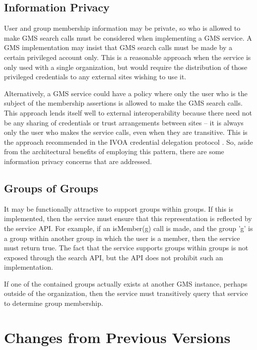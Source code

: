 \documentclass[11pt,a4paper]{ivoa}
\begin{document}
\subsection{Information Privacy}
\label{subsec:infopriv}

User and group membership information may be private, so who is allowed to make GMS search calls must be considered when implementing a GMS service.  A GMS implementation may insist that GMS search calls must be made by a certain privileged account only.  This is a reasonable approach when the service is only used with a single organization, but would require the distribution of those privileged credentials to any external sites wishing to use it.

Alternatively, a GMS service could have a policy where only the user who is the subject of the membership assertions is allowed to make the GMS search calls.  This approach lends itself well to external interoperability because there need not be any sharing of credentials or trust arrangements between sites -- it is always only the user who makes the service calls, even when they are transitive.  This is the approach recommended in the  IVOA credential delegation protocol \citep{2010ivoa.spec.0218P}.  So, aside from the architectural benefits of employing this pattern, there are some information privacy concerns that are addressed.

\subsection{Groups of Groups}

It may be functionally attractive to support groups within groups.  If this is implemented, then the service must ensure that this representation is reflected by the service API.  For example, if an isMember(g) call is made, and the group 'g' is a group within another group in which the user is a member, then the service must return true.  The fact that the service supports groups within groups is not exposed through the search API, but the API does not prohibit such an implementation.

If one of the contained groups actually exists at another GMS instance, perhaps outside of the organization, then the service must transitively query that service to determine group membership.

\appendix

\section{Changes from Previous Versions}
\end{document}
